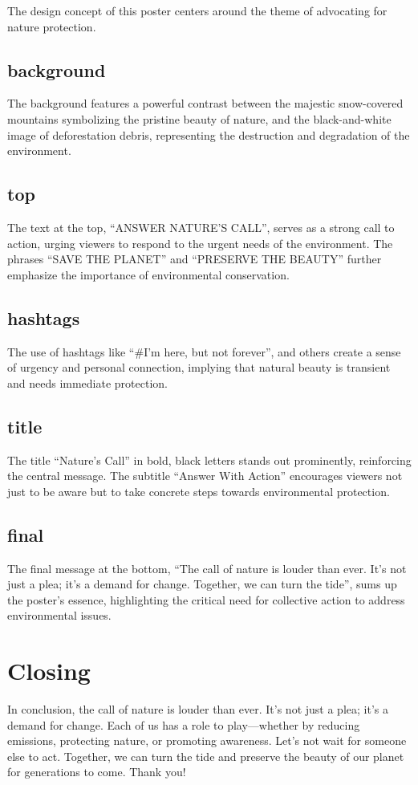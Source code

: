 \documentclass[a4paper]{ctexart}
\begin{document}
The design concept of this poster centers around the theme of advocating for nature protection.

\subsection{background}
The background features a powerful contrast between the majestic
snow-covered mountains symbolizing the pristine beauty of nature,
and the black-and-white image of deforestation debris,
representing the destruction and degradation of the environment.

\subsection{top}
The text at the top, ``ANSWER NATURE'S CALL'',
serves as a strong call to action,
urging viewers to respond to the urgent needs of the environment.
The phrases ``SAVE THE PLANET'' and ``PRESERVE THE BEAUTY'' further emphasize the importance of environmental conservation.

\subsection{hashtags}
The use of hashtags like ``\#I'm here, but not forever'',
and others create a sense of urgency and personal connection,
implying that natural beauty is transient and needs immediate protection.

\subsection{title}
The title ``Nature's Call'' in bold,
black letters stands out prominently, reinforcing the central message.
The subtitle ``Answer With Action'' encourages viewers not just to be aware
but to take concrete steps towards environmental protection.

\subsection{final}
The final message at the bottom, ``The call of nature is louder than ever.
It's not just a plea; it's a demand for change. Together, we can turn the tide'',
sums up the poster's essence, highlighting the critical need for collective action to address environmental issues.

\section{Closing}
In conclusion, the call of nature is louder than ever. It's not just a plea;
it's a demand for change.
Each of us has a role to play—whether by reducing emissions, protecting nature, or promoting awareness. Let's not wait for someone else to act.
Together, we can turn the tide and preserve the beauty of our planet for generations to come.
Thank you!
\end{document}
